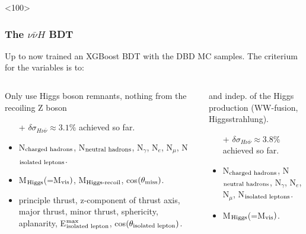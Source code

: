 \begin{frame}<100>
  \frametitle{The \texorpdfstring{$\nu\bar{\nu}H$}{vvH} BDT}
  Up to now trained an XGBoost BDT with the DBD MC samples.
  The criterium for the variables is to:
  \begin{columns}[c,onlytextwidth]
  \begin{column}{0.5\textwidth}
  \begin{block}{Only use Higgs boson remnants, nothing from the recoiling Z boson}
  \begin{itemize}
    \item[+] $\delta\sigma_{H\nu\bar{\nu}}\approx3.1\%$ achieved so far.
    \item N$_{\textnormal{charged hadrons}}$, N$_{\textnormal{neutral hadrons}}$, N$_\gamma$,
        N$_e$, N$_\mu$, N$_{\textnormal{isolated leptons}}$.
    \item M$_{\textnormal{Higgs}}$(=M$_{\textnormal{vis}})$, M$_{\textnormal{Higgs-recoil}}$,
        cos$(\theta_{\textnormal{miss}})$.
    \item principle thrust, z-component of thrust axis, major thrust,
        minor thrust, sphericity, aplanarity,
        E$^{\textnormal{max}}_{\textnormal{isolated lepton}}$,
        cos$(\theta_{\textnormal{isolated lepton}})$.
  \end{itemize}
  \end{block}
  \end{column}
  \begin{column}{0.5\textwidth}
  \begin{block}{and indep. of the Higgs production (WW-fusion, Higgsstrahlung).}
  \begin{itemize}
    \item[+] $\delta\sigma_{H\nu\bar{\nu}}\approx3.8\%$ achieved so far.
    \item N$_{\textnormal{charged hadrons}}$, N$_{\textnormal{neutral hadrons}}$, N$_\gamma$,
        N$_e$, N$_\mu$, N$_{\textnormal{isolated leptons}}$.
    \item M$_{\textnormal{Higgs}}$(=M$_{\textnormal{vis}})$.
    \item[]
    \item[]
    \item[]
    \item[]
  \end{itemize}
  \end{block}
  \end{column}
  \end{columns}
  \end{frame}

